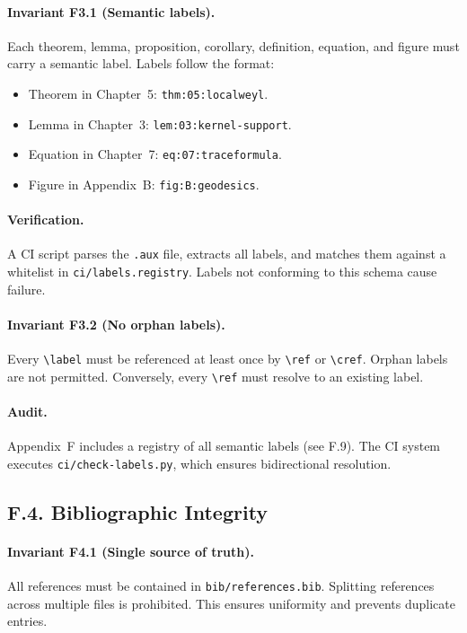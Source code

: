 \paragraph{Invariant F3.1 (Semantic labels).} Each theorem, lemma, proposition, corollary, definition, equation, and figure must carry a semantic label. Labels follow the format:
\begin{itemize}
    \item Theorem in Chapter~5: \texttt{thm:05:localweyl}.
    \item Lemma in Chapter~3: \texttt{lem:03:kernel-support}.
    \item Equation in Chapter~7: \texttt{eq:07:traceformula}.
    \item Figure in Appendix~B: \texttt{fig:B:geodesics}.
\end{itemize}

\paragraph{Verification.} A CI script parses the \texttt{.aux} file, extracts all labels, and matches them against a whitelist in \texttt{ci/labels.registry}. Labels not conforming to this schema cause failure.

\paragraph{Invariant F3.2 (No orphan labels).} Every \texttt{\textbackslash label} must be referenced at least once by \texttt{\textbackslash ref} or \texttt{\textbackslash cref}. Orphan labels are not permitted. Conversely, every \texttt{\textbackslash ref} must resolve to an existing label.

\paragraph{Audit.} Appendix~F includes a registry of all semantic labels (see F.9). The CI system executes \texttt{ci/check-labels.py}, which ensures bidirectional resolution.

\subsection*{F.4. Bibliographic Integrity}

\paragraph{Invariant F4.1 (Single source of truth).} All references must be contained in \texttt{bib/references.bib}. Splitting references across multiple files is prohibited. This ensures uniformity and prevents duplicate entries.

